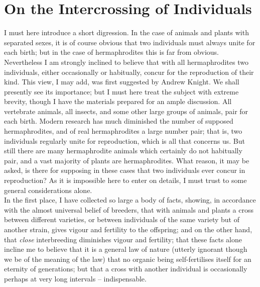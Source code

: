\section{On the Intercrossing of Individuals}
\indent I must here introduce a short digression. In the case of animals and plants with separated sexes, it is of course obvious that two individuals must always unite for each birth; but in the case of hermaphrodites this is far from obvious.  Nevertheless I am strongly inclined to believe that with all hermaphrodites two individuals, either occasionally or habitually, concur for the reproduction of their kind. This view, I may add, was first suggested by Andrew Knight.  We shall presently see its importance; but I must here treat the subject with extreme brevity, though I have the materials prepared for an ample discussion. All vertebrate animals, all insects, and some other large groups of animals, pair for each birth. Modern research has much diminished the number of supposed hermaphrodites, and of real hermaphrodites a large number pair; that is, two individuals regularly unite for reproduction, which is all that concerns us. But still there are many hermaphrodite animals which certainly do not habitually pair, and a vast majority of plants are hermaphrodites. What reason, it may be asked, is there for supposing in these cases that two individuals ever concur in reproduction? As it is impossible here to enter on details, I must trust to some general considerations alone. \\
\indent In the first place, I have collected so large a body of facts, showing, in accordance with the almost universal belief of breeders, that with animals and plants a cross between different varieties, or between individuals of the same variety but of another strain, gives vigour and fertility to the offspring; and on the other hand, that \emph{close} interbreeding diminishes vigour and fertility; that these facts alone incline me to believe that it is a general law of nature (utterly ignorant though we be of the meaning of the law) that no organic being self-fertilises itself for an eternity of generations; but that a cross with another individual is occasionally perhaps at very long intervals -- indispensable. \\
